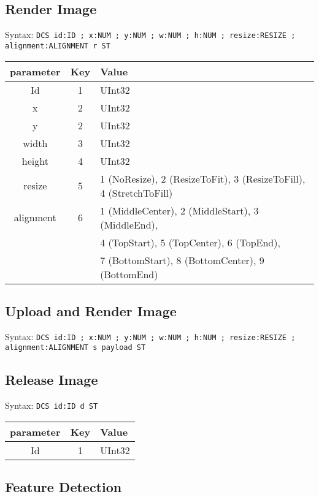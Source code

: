 \documentclass{article}
\newcommand{\code}[1]{\colorbox{light-gray}{\texttt{#1}}}
\begin{document}
\subsection{Render Image}

Syntax: \code{DCS id:ID ; x:NUM ; y:NUM ; w:NUM ; h:NUM ; resize:RESIZE ; alignment:ALIGNMENT r ST}

\begin{tabular}{ |c|c|l| }
    \hline
    parameter   & Key & Value \\
    \hline
    Id          & 1   & UInt32 \\
    x           & 2   & UInt32 \\
    y           & 2   & UInt32 \\
    width       & 3   & UInt32 \\
    height      & 4   & UInt32 \\
    resize      & 5   & 1 (NoResize), 2 (ResizeToFit), 3 (ResizeToFill), 4 (StretchToFill) \\
    alignment   & 6   & 1 (MiddleCenter), 2 (MiddleStart), 3 (MiddleEnd), \\
                &     & 4 (TopStart), 5 (TopCenter), 6 (TopEnd), \\
                &     & 7 (BottomStart), 8 (BottomCenter), 9 (BottomEnd) \\
    \hline
\end{tabular}

\subsection{Upload and Render Image}

Syntax: \code{DCS id:ID ; x:NUM ; y:NUM ; w:NUM ; h:NUM ; resize:RESIZE ; alignment:ALIGNMENT s payload ST}

\subsection{Release Image}

Syntax: \code{DCS id:ID d ST}

\begin{tabular}{ |c|c|l| }
    \hline
    parameter   & Key & Value \\
    \hline
    Id          & 1   & UInt32 \\
    \hline
\end{tabular}

\subsection{Feature Detection}
\end{document}

